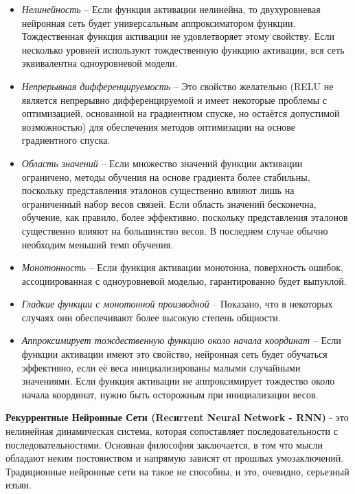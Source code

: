 \documentclass[a4paper,russian]{article}
\begin{document}
	\begin{itemize}
		\item \textit{Нелинейность} – Если функция активации нелинейна, то двухуровневая нейронная сеть будет универсальным аппроксиматором функции. Тождественная функция активации не удовлетворяет этому свойству. Если несколько уровней используют тождественную функцию активации, вся сеть эквивалентна одноуровневой модели.
		
		\item \textit{Непрерывная дифференцируемость} – Это свойство желательно (RELU не является непрерывно дифференцируемой и имеет некоторые проблемы с оптимизацией, основанной на градиентном спуске, но остаётся допустимой возможностью) для обеспечения методов оптимизации на основе градиентного спуска.
		
		\item \textit{Область значений} – Если множество значений функции активации ограничено, методы обучения на основе градиента более стабильны, поскольку представления эталонов существенно влияют лишь на ограниченный набор весов связей. Если область значений бесконечна, обучение, как правило, более эффективно, поскольку представления эталонов существенно влияют на большинство весов. В последнем случае обычно необходим меньший темп обучения.
		
		\item \textit{Монотонность} – Если функция активации монотонна, поверхность ошибок, ассоциированная с одноуровневой моделью, гарантированно будет выпуклой.
		
		\item \textit{Гладкие функции с монотонной производной} – Показано, что в некоторых случаях они обеспечивают более высокую степень общности.
		 
		\item \textit{Аппроксимирует тождественную функцию около начала координат} – Если функции активации имеют это свойство, нейронная сеть будет обучаться эффективно, если её веса инициализированы малыми случайными значениями. Если функция активации не аппроксимирует тождество около начала координат, нужно быть осторожным при инициализации весов.
	\end{itemize}
	
	\textbf{Рекуррентные Нейронные Сети (Recиrrent Neural Network - RNN)} - это нелинейная динамическая система, которая сопоставляет последовательности с последовательностями. Основная философия заключается, в том что мысли обладают неким постоянством и напрямую зависят от прошлых умозаключений. Традиционные нейронные сети на такое не способны, и это, очевидно, серьезный изъян. 
	
\end{document}
